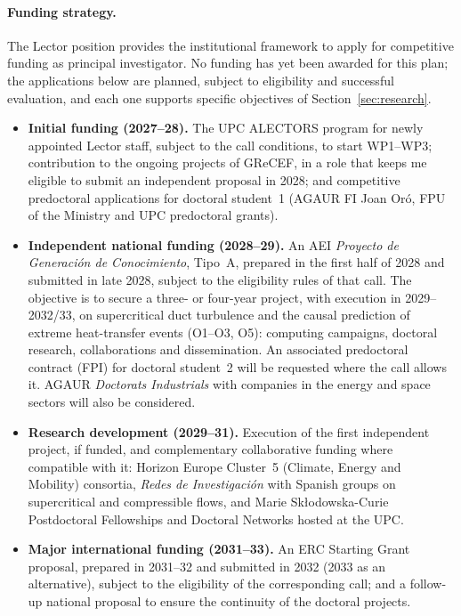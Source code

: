 \documentclass[11pt]{article}
\begin{document}
\paragraph{Funding strategy.} The Lector position provides the institutional framework to
apply for competitive funding as principal investigator. No funding has yet been awarded for
this plan; the applications below are planned, subject to eligibility and successful
evaluation, and each one supports specific objectives of Section~\ref{sec:research}.
\begin{itemize}
  \item \textbf{Initial funding (2027--28).} The UPC ALECTORS program for newly appointed
  Lector staff, subject to the call conditions, to start WP1--WP3; contribution to the
  ongoing projects of GReCEF, in a role that keeps me eligible to submit an independent
  proposal in 2028; and competitive predoctoral applications for doctoral student~1 (AGAUR
  FI Joan Or\'o, FPU of the Ministry and UPC predoctoral grants).
  \item \textbf{Independent national funding (2028--29).} An AEI \emph{Proyecto de
  Generaci\'on de Conocimiento}, Tipo~A, prepared in the first half of 2028 and submitted in
  late 2028, subject to the eligibility rules of that call. The objective is to secure a three-
  or four-year project, with execution in 2029--2032/33, on supercritical duct turbulence and
  the causal prediction of extreme heat-transfer events (O1--O3, O5): computing campaigns,
  doctoral research, collaborations and dissemination. An associated predoctoral contract
  (FPI) for doctoral student~2 will be requested where the call allows it. AGAUR
  \emph{Doctorats Industrials} with companies in the energy and space sectors will also be
  considered.
  \item \textbf{Research development (2029--31).} Execution of the first independent project,
  if funded, and complementary collaborative funding where compatible with it: Horizon
  Europe Cluster~5 (Climate, Energy and Mobility) consortia, \emph{Redes de Investigaci\'on}
  with Spanish groups on supercritical and compressible flows, and Marie
  Sk\l{}odowska-Curie Postdoctoral Fellowships and Doctoral Networks hosted at the UPC.
  \item \textbf{Major international funding (2031--33).} An ERC Starting Grant proposal,
  prepared in 2031--32 and submitted in 2032 (2033 as an alternative), subject to the
  eligibility of the corresponding call; and a follow-up national proposal to ensure the
  continuity of the doctoral projects.
\end{itemize}
\end{document}
